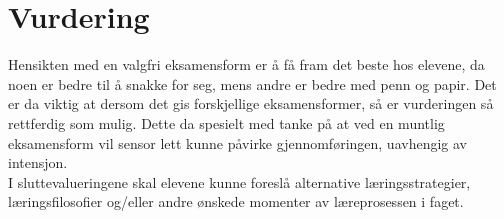 \section*{Vurdering} \label{Sec: Vurdering}


Hensikten med en valgfri eksamensform er å få fram det beste hos elevene, da noen er bedre til å snakke for seg, mens andre er bedre med penn og papir.
Det er da viktig at dersom det gis forskjellige eksamensformer, så er vurderingen så rettferdig som mulig. Dette da spesielt med tanke på at ved en muntlig eksamensform vil sensor lett kunne påvirke gjennomføringen, uavhengig av intensjon. \\

I sluttevalueringene skal elevene kunne foreslå alternative læringsstrategier, læringsfilosofier og/eller andre ønskede momenter av læreprosessen i faget.

